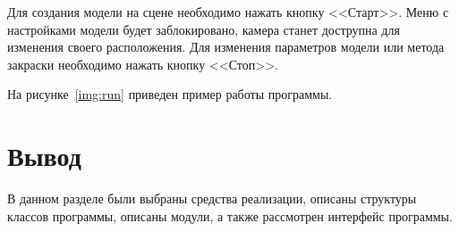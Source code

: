 \newpage
Для создания модели на сцене необходимо нажать кнопку <<Старт>>. 
Меню с настройками модели будет заблокировано, камера станет дострупна для изменения своего расположения.
Для изменения параметров модели или метода закраски необходимо нажать кнопку <<Стоп>>.

На рисунке~\ref{img:run} приведен пример работы программы.

\section*{Вывод}

В данном разделе были выбраны средства реализации, описаны структуры классов программы, описаны модули, а также рассмотрен интерфейс программы.
